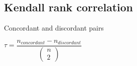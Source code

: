 
\subsection{Kendall rank correlation}

Concordant and discordant pairs


\(\tau = \dfrac{n_{concordant}-n_{discordant}}{\begin{pmatrix}n\\2\end{pmatrix}}\)



